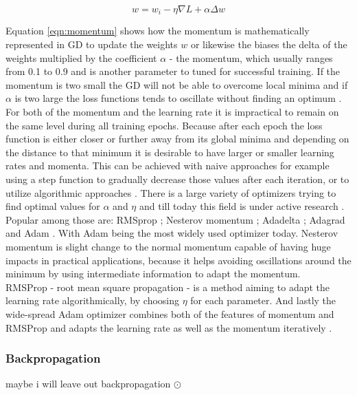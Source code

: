 \begin{equation}
  w = w_i - \eta \nabla L + \alpha \Delta w
  \label{eqn:momentum}
\end{equation}

Equation \ref{eqn:momentum} shows how the momentum is mathematically represented in GD to update the weights
$w$ or likewise the biases the delta of the weights multiplied by the coefficient $\alpha$ - the momentum,
which usually ranges from 0.1 to 0.9 and is another parameter to tuned for successful training. If the
momentum is two small the GD will not be able to overcome local minima and if $\alpha$ is two large the loss
functions tends to oscillate without finding an optimum \cite{lecun2015deep}.  For both of the momentum and
the learning rate it is impractical to remain on the same level during all training epochs. Because after each
epoch the loss function is either closer or further away from its global minima and depending on the distance
to that minimum it is desirable to have larger or smaller learning rates and momenta. This can be achieved
with naive approaches for example using a step function to gradually decrease those values after each
iteration, or to utilize algorithmic approaches \cite{michie1994machine}.  There is a large variety of
optimizers trying to find optimal values for $\alpha$ and $\eta$ and till today this field is under active
research \cite{goodfellow2016deep}. Popular among those are: RMSprop \cite{hinton2012neural}; Nesterov
momentum \cite{dozat2016incorporating}; Adadelta \cite{zeiler2012adadelta}; Adagrad \cite{ruder2016overview}
and Adam \cite{kingma2014adam}. With Adam being the most widely used optimizer today.  Nesterov momentum is
slight change to the
normal momentum capable of having huge impacts in practical applications, because it helps avoiding oscillations around the minimum by using intermediate information to adapt the momentum. \\
RMSProp - root mean square propagation - is a method aiming to adapt the learning rate algorithmically, by
choosing $\eta$ for each parameter.  And lastly the wide-spread Adam optimizer combines both of the features
of momentum and RMSProp and adapts the learning rate as well as the momentum iteratively
\cite{kingma2014adam}.


\subsubsection{Backpropagation}
maybe i will leave out backpropagation
$\odot$

